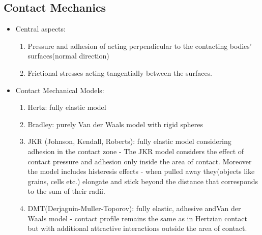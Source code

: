 \documentclass[10pt,a4paper]{article}
\begin{document}
\subsection{Contact Mechanics}
\begin{itemize}
 \item Central aspects:
 \begin{enumerate}
  \item Pressure and adhesion of acting perpendicular to the contacting bodies' surfaces(normal direction)
  \item Frictional stresses acting tangentially between the surfaces.
 \end{enumerate}

 \item Contact Mechanical Models:
 \begin{enumerate}
  \item Hertz: fully elastic model
  \item Bradley: purely Van der Waals model with rigid spheres
  \item JKR (Johnson, Kendall, Roberts): fully elastic model considering adhesion in the contact zone  - The JKR model considers the effect of contact pressure and adhesion only inside the area of contact. 
  Moreover the model includes histeresis effects - when pulled away they(objects like grains, cells etc.) elongate and stick beyond the distance that corresponds to the sum of their radii.
  \item DMT(Derjaguin-Muller-Toporov): fully elastic, adhesive andVan der Waals model -  contact profile remains the same as in Hertzian contact but with additional attractive interactions outside the area of contact.
 \end{enumerate}


\end{itemize}
\end{document}
